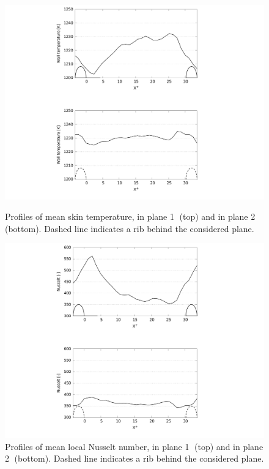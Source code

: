 \begin{figure}[h!]
\begin{minipage}[c]{1.0\linewidth}
\centering
\includegraphics[width=0.5\linewidth,keepaspectratio]{fig/applications/optim/Twall_curves.pdf}
\caption{Profiles of mean skin temperature, in plane \textcircled{1} (top) and in plane \textcircled{2} (bottom). Dashed line indicates a rib behind the considered plane.}
\label{Twall_curves}
\end{minipage}

\begin{minipage}[c]{1.0\linewidth}
\centering
\includegraphics[width=0.5\linewidth,keepaspectratio]{fig/applications/optim/Nusselt.pdf}
\caption{Profiles of mean local Nusselt number, in plane \textcircled{1} (top) and in plane \textcircled{2} (bottom). Dashed line indicates a rib behind the considered plane.}
\label{Nusselt}
\end{minipage}
\end{figure}

